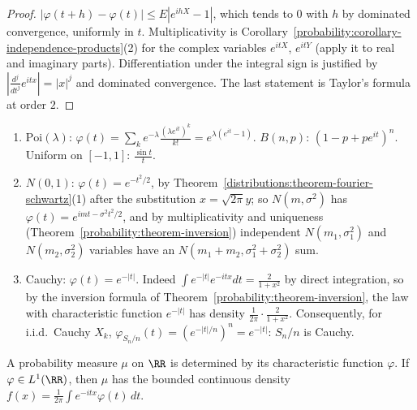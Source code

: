 \begin{proof}
$|\varphi(t + h) - \varphi(t)| \leq E|e^{ihX} - 1|$, which tends to $0$ with $h$ by dominated convergence, uniformly in $t$. Multiplicativity is Corollary~\ref{probability:corollary-independence-products}(2) for the complex
variables $e^{itX}$, $e^{itY}$ (apply it to real and imaginary parts). Differentiation under the integral sign is justified by $|\frac{d^j}{dt^j}e^{itx}| = |x|^j$ and dominated convergence. The last statement is Taylor's formula
at order $2$.
\end{proof}

\begin{example}\label{probability:example-characteristic-functions}
\begin{enumerate}
\item $\mathrm{Poi}(\lambda)$: $\varphi(t) = \sum_ke^{-\lambda}\frac{(\lambda e^{it})^k}{k!} = e^{\lambda(e^{it} - 1)}$. $B(n, p)$: $(1 - p + pe^{it})^n$. Uniform on $[-1, 1]$: $\frac{\sin t}{t}$.
\item $N(0, 1)$: $\varphi(t) = e^{-t^2/2}$, by Theorem~\ref{distributions:theorem-fourier-schwartz}(1) after the substitution $x = \sqrt{2\pi}y$; so $N(m, \sigma^2)$ has $\varphi(t) = e^{imt - \sigma^2t^2/2}$, and by multiplicativity and
uniqueness (Theorem~\ref{probability:theorem-inversion}) independent $N(m_1, \sigma_1^2)$ and $N(m_2, \sigma_2^2)$ variables have an $N(m_1 + m_2, \sigma_1^2 + \sigma_2^2)$ sum.
\item Cauchy: $\varphi(t) = e^{-|t|}$. Indeed $\int e^{-|t|}e^{-itx}dt = \frac{2}{1 + x^2}$ by direct integration, so by the inversion formula of Theorem~\ref{probability:theorem-inversion}, the law with characteristic function $e^{-|t|}$ has
density $\frac{1}{2\pi}\cdot\frac{2}{1 + x^2}$. Consequently, for i.i.d.\ Cauchy $X_k$, $\varphi_{S_n/n}(t) = (e^{-|t|/n})^n = e^{-|t|}$: $S_n/n$ is Cauchy.
\end{enumerate}
\end{example}

\begin{theorem}\label{probability:theorem-inversion}
A probability measure $\mu$ on $\RR$ is determined by its characteristic function $\varphi$. If $\varphi \in L^1(\RR)$, then $\mu$ has the bounded continuous density $f(x) = \frac{1}{2\pi}\int e^{-itx}\varphi(t)\,dt$.
\end{theorem}

